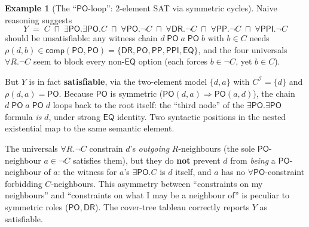 \documentclass[
]{ceurart}
\theoremstyle{definition}
\newtheorem{examplex}[theorem]{Example}
\newcommand{\DR}{\ensuremath{\mathsf{DR}}}
\newcommand{\PO}{\ensuremath{\mathsf{PO}}}
\newcommand{\EQ}{\ensuremath{\mathsf{EQ}}}
\newcommand{\PP}{\ensuremath{\mathsf{PP}}}
\newcommand{\PPI}{\ensuremath{\mathsf{PPI}}}
\newcommand{\comp}{\ensuremath{\mathsf{comp}}}
\begin{document}
\begin{examplex}[The ``$\PO$-loop'': 2-element SAT via symmetric cycles]
\label{ex:po-loop}
Naive reasoning suggests
\[
  Y \;=\; C
    \;\sqcap\; \exists\PO.\exists\PO.C
    \;\sqcap\; \forall\PO.\neg C
    \;\sqcap\; \forall\DR.\neg C
    \;\sqcap\; \forall\PP.\neg C
    \;\sqcap\; \forall\PPI.\neg C
\]
should be unsatisfiable: any witness chain
$d \;\PO\; a \;\PO\; b$ with $b \in C$ needs
$\rho(d,b) \in \comp(\PO,\PO) = \{\DR,\PO,\PP,\PPI,\EQ\}$,
and the four universals $\forall R.\neg C$ seem to block every
non-$\EQ$ option (each forces $b \in \neg C$, yet $b \in C$).

But $Y$ is in fact \textbf{satisfiable}, via the two-element model
$\{d,a\}$ with $C^{\mathcal I} = \{d\}$ and $\rho(d,a) = \PO$.
Because $\PO$ is symmetric
($\PO(d,a) \Rightarrow \PO(a,d)$), the chain
$d \;\PO\; a \;\PO\; d$ loops back to the root itself: the
``third node'' of the $\exists\PO.\exists\PO$ formula \emph{is}
$d$, under strong $\EQ$ identity. Two syntactic positions in the
nested existential map to the same semantic element.

The universals $\forall R.\neg C$ constrain $d$'s \emph{outgoing}
$R$-neighbours (the sole $\PO$-neighbour $a \in \neg C$
satisfies them), but they do \textbf{not} prevent $d$ from
\emph{being} a $\PO$-neighbour of $a$: the witness for $a$'s
$\exists\PO.C$ is $d$ itself, and $a$ has no
$\forall\PO$-constraint forbidding $C$-neighbours.
This asymmetry between ``constraints on my neighbours'' and
``constraints on what I may be a neighbour of'' is peculiar
to symmetric roles ($\PO,\DR$). The cover-tree tableau correctly
reports $Y$ as satisfiable.
\end{examplex}
\end{document}
